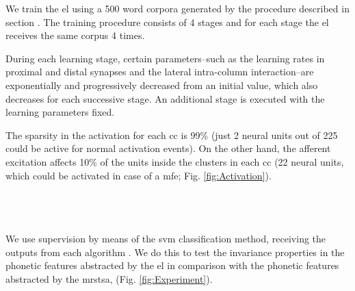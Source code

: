 \documentclass[10pt,letterpaper]{article}
\begin{document}
We train the \gls{el} using a 500 word corpora generated by the procedure described in section .
The training procedure consists of 4 stages and for each stage the \gls{el} receives the same corpus 4 times.

During each learning stage, certain parameters--such as the learning rates in proximal and distal synapses and the lateral
intra-column interaction--are exponentially and progressively decreased from an initial value, which also decreases
for each successive stage.
An additional stage is executed with the learning parameters fixed.

The sparsity in the activation for each \gls{cc} is 99\% (just 2 neural units out of 225 could be active for normal activation events).
On the other hand, the afferent excitation affects 10\% of the units inside the clusters in each \gls{cc}
(22 neural units, which could be activated in case of a \gls{mfe}; Fig. \ref{fig:Activation}).









~\\
~\\
~\\



We use supervision by means of the \gls{svm} classification
method, receiving the outputs from each algorithm \cite{CC01a, libsvm}. We do this to test the invariance properties in the phonetic features abstracted by the \gls{el} in comparison
with the phonetic features abstracted by the \gls{mrstsa}, 
(Fig. \ref{fig:Experiment}).
\end{document}
